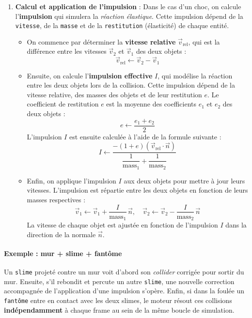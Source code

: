 \documentclass[a4paper,11pt]{article}
\begin{document}
\begin{enumerate}
    \item \textbf{Calcul et application de l’impulsion} : Dans le cas d’un choc, on calcule l'\textbf{impulsion} qui simulera la \textit{réaction élastique}. Cette impulsion dépend de la \texttt{vitesse}, de la \texttt{masse} et de la \texttt{restitution} (élasticité) de chaque entité.
    \begin{itemize}
        \item On commence par déterminer la \textbf{vitesse relative} \(\vec{v}_{\text{rel}}\), qui est la différence entre les vitesses \(\vec{v}_2\) et \(\vec{v}_1\) des deux objets :
        \[
        \vec{v}_{\text{rel}} \gets \vec{v}_2 - \vec{v}_1
        \]
        \item Ensuite, on calcule l'\textbf{impulsion effective} \(I\), qui modélise la réaction entre les deux objets lors de la collision. Cette impulsion dépend de la vitesse relative, des masses des objets et de leur restitution \(e\). Le coefficient de restitution \(e\) est la moyenne des coefficients \(e_1\) et \(e_2\) des deux objets :
        \[
        e \gets \frac{e_1 + e_2}{2}
        \]
        L'impulsion \(I\) est ensuite calculée à l'aide de la formule suivante :
        \[
        I \gets \frac{-(1 + e) \left( \vec{v}_{\text{rel}} \cdot \vec{n} \right)}{\dfrac{1}{\text{mass}_1} + \dfrac{1}{\text{mass}_2}}
        \]
        \item Enfin, on applique l'impulsion \(I\) aux deux objets pour mettre à jour leurs vitesses. L'impulsion est répartie entre les deux objets en fonction de leurs masses respectives :
        \[
        \vec{v}_1 \gets \vec{v}_1 + \frac{I}{\text{mass}_1} \, \vec{n}, \quad \vec{v}_2 \gets \vec{v}_2 - \frac{I}{\text{mass}_2} \, \vec{n}
        \]
        La vitesse de chaque objet est ajustée en fonction de l'impulsion \(I\) dans la direction de la normale \(\vec{n}\).
    \end{itemize}
\end{enumerate}

\paragraph{Exemple : mur + slime + fantôme}
Un \texttt{slime} projeté contre un mur voit d'abord son \textit{collider} corrigée pour sortir du mur. Ensuite, s’il rebondit et percute un autre \texttt{slime}, une nouvelle correction accompagnée de l'application d'une impulsion s'opère. Enfin, si dans la foulée un \texttt{fantôme} entre en contact avec les deux slimes, le moteur résout ces collisions \textbf{indépendamment} à chaque frame au sein de la même boucle de simulation.
\end{document}
